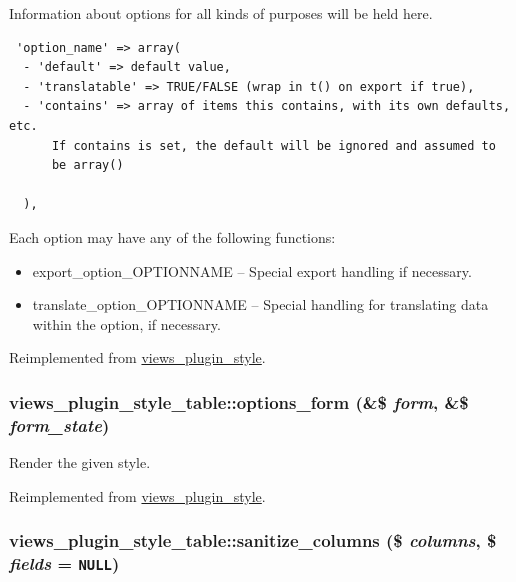 Information about options for all kinds of purposes will be held here. 

\begin{Code}\begin{verbatim} 'option_name' => array(
  - 'default' => default value,
  - 'translatable' => TRUE/FALSE (wrap in t() on export if true),
  - 'contains' => array of items this contains, with its own defaults, etc.
      If contains is set, the default will be ignored and assumed to
      be array()

  ),
\end{verbatim}
\end{Code}

 Each option may have any of the following functions:\begin{itemize}
\item export\_\-option\_\-OPTIONNAME -- Special export handling if necessary.\item translate\_\-option\_\-OPTIONNAME -- Special handling for translating data within the option, if necessary. \end{itemize}


Reimplemented from \hyperlink{classviews__plugin__style_95b6f2eadf403ff36f1ff2860294b3c2}{views\_\-plugin\_\-style}.\hypertarget{classviews__plugin__style__table_732752fb9b74bdb48673cb9ff4150be9}{
\subsubsection[{options\_\-form}]{\setlength{\rightskip}{0pt plus 5cm}views\_\-plugin\_\-style\_\-table::options\_\-form (\&\$ {\em form}, \/  \&\$ {\em form\_\-state})}}
\label{classviews__plugin__style__table_732752fb9b74bdb48673cb9ff4150be9}


Render the given style. 

Reimplemented from \hyperlink{classviews__plugin__style_fe3d437ff4398315b15c4e60975dbb1c}{views\_\-plugin\_\-style}.\hypertarget{classviews__plugin__style__table_1ab90a2782f6061d998a6db033100fdc}{
\subsubsection[{sanitize\_\-columns}]{\setlength{\rightskip}{0pt plus 5cm}views\_\-plugin\_\-style\_\-table::sanitize\_\-columns (\$ {\em columns}, \/  \$ {\em fields} = {\tt NULL})}}
\label{classviews__plugin__style__table_1ab90a2782f6061d998a6db033100fdc}


